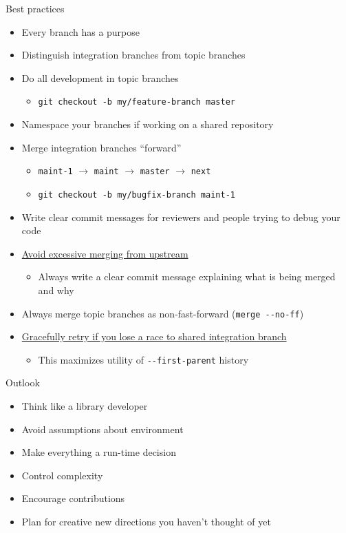 \documentclass{beamer}
\begin{document}
\begin{frame}{Best practices}
  \begin{itemize}
  \item Every branch has a purpose
  \item Distinguish integration branches from topic branches
  \item Do all development in topic branches
    \begin{itemize}
    \item \texttt{git checkout -b my/feature-branch master}
    \end{itemize}
  \item Namespace your branches if working on a shared repository
  \item Merge integration branches ``forward''
    \begin{itemize}
    \item \texttt{maint-1} $\to$ \texttt{maint} $\to$ \texttt{master} $\to$ \texttt{next}
    \item \texttt{git checkout -b my/bugfix-branch maint-1}
    \end{itemize}
  \item Write clear commit messages for reviewers and people trying to debug your code
  \item \href{https://bitbucket.org/petsc/petsc/wiki/developer-instructions-git\#markdown-header-merging}{Avoid excessive merging from upstream}
    \begin{itemize}
    \item Always write a clear commit message explaining what is being merged and why
    \end{itemize}
  \item Always merge topic branches as non-fast-forward (\texttt{merge -{}-no-ff})
  \item \href{https://bitbucket.org/petsc/petsc/wiki/developer-instructions-git\#markdown-header-racy-integration}{Gracefully retry if you lose a race to shared integration branch}
    \begin{itemize}
    \item This maximizes utility of \texttt{-{}-first-parent} history
    \end{itemize}
  \end{itemize}
\end{frame}

\begin{frame}{Outlook}
  \begin{itemize}
  \item Think like a library developer
  \item Avoid assumptions about environment
  \item Make everything a run-time decision
  \item Control complexity
  \item Encourage contributions
  \item Plan for creative new directions you haven't thought of yet
  \end{itemize}
\end{frame}
\end{document}
